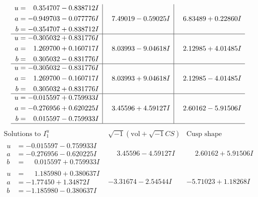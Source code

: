 \documentclass[1p]{elsarticle_modified}
\theoremstyle{definition}
\newcommand{\I}{\sqrt{-1}}
\begin{document}
$$\begin{array}{c|c|c}
\begin{aligned}
u &= \phantom{-}0.354707 - 0.838712 I \\
a &= -0.949703 - 0.077776 I \\
b &= -0.354707 + 0.838712 I\end{aligned}
 & \phantom{-}7.49019 - 0.59025 I & \phantom{-}6.83489 + 0.22860 I \\ \hline\begin{aligned}
u &= -0.305032 + 0.831776 I \\
a &= \phantom{-}1.269700 + 0.160717 I \\
b &= \phantom{-}0.305032 - 0.831776 I\end{aligned}
 & \phantom{-}8.03993 - 9.04618 I & \phantom{-}2.12985 + 4.01485 I \\ \hline\begin{aligned}
u &= -0.305032 - 0.831776 I \\
a &= \phantom{-}1.269700 - 0.160717 I \\
b &= \phantom{-}0.305032 + 0.831776 I\end{aligned}
 & \phantom{-}8.03993 + 9.04618 I & \phantom{-}2.12985 - 4.01485 I \\ \hline\begin{aligned}
u &= -0.015597 + 0.759933 I \\
a &= -0.276956 + 0.620225 I \\
b &= \phantom{-}0.015597 - 0.759933 I\end{aligned}
 & \phantom{-}3.45596 + 4.59127 I & \phantom{-}2.60162 - 5.91506 I\\
 \hline 
 \end{array}$$\newpage$$\begin{array}{c|c|c}  
\text{Solutions to }I^u_{1}& \I (\text{vol} + \sqrt{-1}CS) & \text{Cusp shape}\\
 \hline 
\begin{aligned}
u &= -0.015597 - 0.759933 I \\
a &= -0.276956 - 0.620225 I \\
b &= \phantom{-}0.015597 + 0.759933 I\end{aligned}
 & \phantom{-}3.45596 - 4.59127 I & \phantom{-}2.60162 + 5.91506 I \\ \hline\begin{aligned}
u &= \phantom{-}1.185980 + 0.380637 I \\
a &= -1.77450 + 1.34872 I \\
b &= -1.185980 - 0.380637 I\end{aligned}
 & -3.31674 - 2.54544 I & -5.71023 + 1.18268 I \\ \hline\begin{aligned}

\end{aligned}
\end{array}$$
\end{document}
